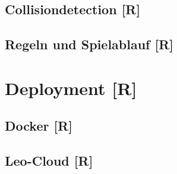 \subsection{Collisiondetection [R]}
\subsection{Regeln und Spielablauf [R]}
\section{Deployment [R]}
\subsection{Docker [R]}
\subsection{Leo-Cloud [R]}













